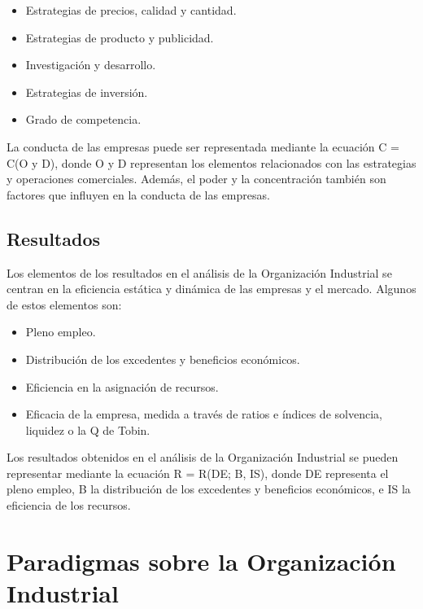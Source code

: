 \documentclass[
  a4paper,
]{article}
\providecommand{\tightlist}{%
  \setlength{\itemsep}{0pt}\setlength{\parskip}{0pt}}\usepackage{longtable,booktabs,array}
\begin{document}
\begin{itemize}
\tightlist
\item
  Estrategias de precios, calidad y cantidad.
\item
  Estrategias de producto y publicidad.
\item
  Investigación y desarrollo.
\item
  Estrategias de inversión.
\item
  Grado de competencia.
\end{itemize}

La conducta de las empresas puede ser representada mediante la ecuación
C = C(O y D), donde O y D representan los elementos relacionados con las
estrategias y operaciones comerciales. Además, el poder y la
concentración también son factores que influyen en la conducta de las
empresas.

\hypertarget{resultados}{%
\subsection{Resultados}\label{resultados}}

Los elementos de los resultados en el análisis de la Organización
Industrial se centran en la eficiencia estática y dinámica de las
empresas y el mercado. Algunos de estos elementos son:

\begin{itemize}
\tightlist
\item
  Pleno empleo.
\item
  Distribución de los excedentes y beneficios económicos.
\item
  Eficiencia en la asignación de recursos.
\item
  Eficacia de la empresa, medida a través de ratios e índices de
  solvencia, liquidez o la Q de Tobin.
\end{itemize}

Los resultados obtenidos en el análisis de la Organización Industrial se
pueden representar mediante la ecuación R = R(DE; B, IS), donde DE
representa el pleno empleo, B la distribución de los excedentes y
beneficios económicos, e IS la eficiencia de los recursos.

\hypertarget{paradigmas-sobre-la-organizaciuxf3n-industrial}{%
\section{Paradigmas sobre la Organización
Industrial}\label{paradigmas-sobre-la-organizaciuxf3n-industrial}}
\end{document}
